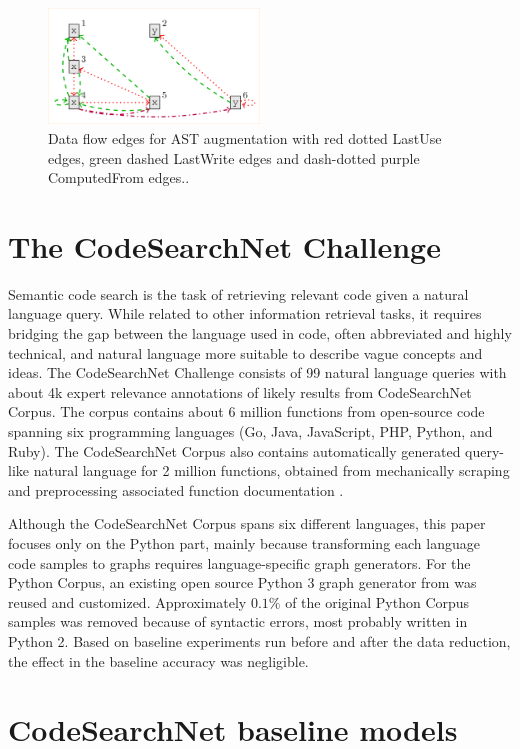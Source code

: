 \documentclass{article}
\begin{document}
\begin{figure}[h]
\includegraphics[width=0.5\textwidth,trim=4 4 4 4,clip]{data_flow.png}
 \centering
\caption{\label{fig:flow}Data flow edges for AST augmentation with red dotted LastUse edges, green dashed LastWrite edges and dash-dotted
purple ComputedFrom edges.\cite{1711.00740}.}
\end{figure}

\section{The CodeSearchNet Challenge}

Semantic code search is the task of retrieving relevant code given a natural language query. While related to other information retrieval tasks, it requires bridging the gap between the language used in code, often abbreviated and highly technical, and natural language more suitable to describe vague concepts and ideas.
The CodeSearchNet Challenge consists of 99 natural language queries with about 4k expert relevance annotations of likely results from CodeSearchNet Corpus. The corpus contains about 6 million functions from open-source code spanning six programming languages (Go, Java, JavaScript, PHP, Python, and Ruby). The CodeSearchNet Corpus also contains automatically generated query-like natural language for 2 million functions, obtained from mechanically scraping and preprocessing associated function documentation \cite{1909.09436}. 

Although the CodeSearchNet Corpus spans six different languages, this paper focuses only on the Python part, mainly because transforming each language code samples to graphs requires language-specific graph generators. For the Python Corpus, an existing open source Python 3 graph generator from \cite{1811.01824} was reused and customized. Approximately $0.1\%$ of the original Python Corpus samples was removed because of syntactic errors, most probably written in Python 2. Based on baseline experiments run before and after the data reduction, the effect in the baseline accuracy was negligible.

\section{CodeSearchNet baseline models}
\end{document}
